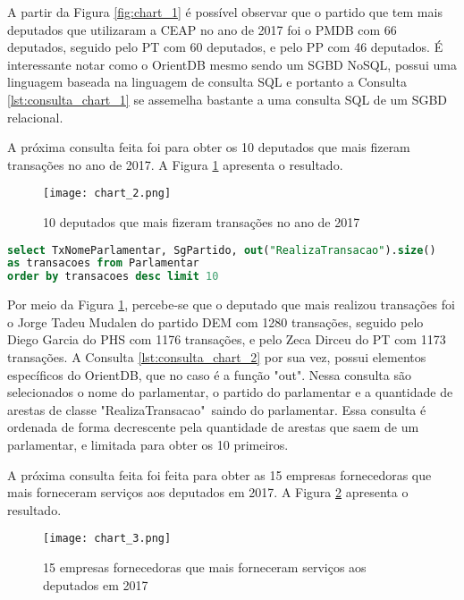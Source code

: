 A partir da Figura \ref{fig:chart_1} é possível observar que o partido que tem mais deputados que utilizaram a CEAP no ano de 2017 foi o PMDB com 66 deputados, seguido pelo PT com 60 deputados, e pelo PP com 46 deputados. É interessante notar como o OrientDB mesmo sendo um SGBD NoSQL, possui uma linguagem baseada na linguagem de consulta SQL e portanto a Consulta \ref{lst:consulta_chart_1} se assemelha bastante a uma consulta SQL de um SGBD relacional.

A próxima consulta feita foi para obter os 10 deputados que mais fizeram transações no ano de 2017. A Figura \ref{fig:chart_2} apresenta o resultado.

\begin{figure}[H]
\centering
\texttt{[image: chart\_2.png]}
\caption{10 deputados que mais fizeram transações no ano de 2017}
\label{fig:chart_2}
\end{figure}

\begin{lstlisting}[label={lst:consulta_chart_2}, caption={Consulta para o gráfico \ref{fig:chart_2}},captionpos=b, language=sql]
select TxNomeParlamentar, SgPartido, out("RealizaTransacao").size() 
as transacoes from Parlamentar 
order by transacoes desc limit 10
\end{lstlisting}

Por meio da Figura \ref{fig:chart_2}, percebe-se que o deputado que mais realizou transações foi o Jorge Tadeu Mudalen do partido DEM com 1280 transações, seguido pelo Diego Garcia do PHS com 1176 transações, e pelo Zeca Dirceu do PT com 1173 transações. A Consulta \ref{lst:consulta_chart_2} por sua vez, possui elementos específicos do OrientDB, que no caso é a função "out". Nessa consulta são selecionados o nome do parlamentar, o partido do parlamentar e a quantidade de arestas de classe "RealizaTransacao"\ saindo do parlamentar. Essa consulta é ordenada de forma decrescente pela quantidade de arestas que saem de um parlamentar, e limitada para obter os 10 primeiros.

A próxima consulta feita foi feita para obter as 15 empresas fornecedoras que mais forneceram serviços aos deputados em 2017. A Figura \ref{fig:chart_3} apresenta o resultado.

\begin{figure}[H]
\centering
\texttt{[image: chart\_3.png]}
\caption{15 empresas fornecedoras que mais forneceram serviços aos deputados em 2017}
\label{fig:chart_3}
\end{figure}

